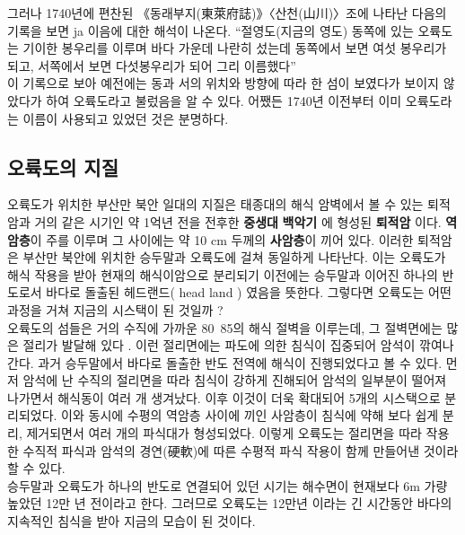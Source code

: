 \documentclass[12pt, a4paper, twoside]{book}
\begin{document}
			
			
			그러나 1740년에 편찬된 《동래부지(東萊府誌)》〈산천(山川)〉조에 나타난 다음의 기록을 보면 ja 이음에 대한 해석이 나온다. 
			“절영도(지금의 영도) 동쪽에 있는 오륙도는 기이한 봉우리를 이루며 바다 가운데 나란히 섰는데 동쪽에서 보면 여섯 봉우리가 되고, 서쪽에서 보면 다섯봉우리가 되어 그리 이름했다”  \\
			
			이 기록으로 보아 예전에는 동과 서의 위치와 방향에 따라 한 섬이 보였다가 보이지 않았다가 하여 오륙도라고 불렀음을 알 수 있다. 
			어쨌든 1740년 이전부터 이미 오륙도라는 이름이 사용되고 있었던 것은 분명하다.
			



	\subsection{오륙도의 지질}
	

			오륙도가 위치한 부산만 북안 일대의 지질은 태종대의 해식 암벽에서 볼 수 있는 퇴적암과 거의 같은 시기인 약 1억년 전을 전후한 \textbf{ 중생대 } \textbf{ 백악기 }에 형성된 \textbf{ 퇴적암 }이다.
			\textbf{역암층}이 주를 이루며 그 사이에는 약 10 cm 두께의 \textbf{사암층}이 끼어 있다. 
			이러한 퇴적암은 부산만 북안에 위치한 승두말과 오륙도에 걸쳐 동일하게 나타난다. 
			이는 오륙도가 해식 작용을 받아 현재의 해식이암으로 분리되기 이전에는 승두말과 이어진 하나의 반도로서 바다로 돌출된 헤드랜드( head land ) 였음을 뜻한다. 
			그렇다면 오륙도는 어떤 과정을 거쳐 지금의 시스택이 된 것일까 ? \\
			
			오륙도의 섬들은 거의 수직에 가까운 80~85의 해식 절벽을 이루는데, 그 절벽면에는 많은 절리가 발달해 있다
			. 이런 절리면에는 파도에 의한 침식이 집중되어 암석이 깎여나간다. 
			과거 승두말에서 바다로 돌출한 반도 전역에 해식이 진행되었다고 볼 수 있다. 
			먼저 암석에 난 수직의 절리면을 따라 침식이 강하게 진해되어 암석의 일부분이 떨어져 나가면서 해식동이 여러 개 생겨났다. 
			이후 이것이 더욱 확대되어 5개의 시스택으로 분리되었다. 
			이와 동시에 수평의 역암층 사이에 끼인 사암층이 침식에 약해 보다 쉽게 분리, 제거되면서 여러 개의 파식대가 형성되었다. 
			이렇게 오륙도는 절리면을 따라 작용한 수직적 파식과 암석의 경연(硬軟)에 따른 수평적 파식 작용이 함께 만들어낸 것이라 할 수 있다. \\
			
			승두말과 오륙도가 하나의 반도로 연결되어 있던 시기는 해수면이 현재보다 6m 가량 높았던 12만 년 전이라고 한다. 
			그러므로 오륙도는 12만년 이라는 긴 시간동안 바다의 지속적인 침식을 받아 지금의 모습이 된 것이다. \\
			
\end{document}
